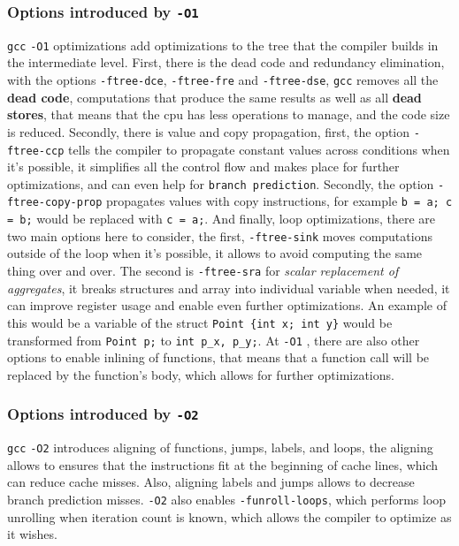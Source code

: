 \documentclass{rapport}
\newcommand{\gcc}{\texttt{gcc} }
\newcommand{\optione}{\texttt{-O1} }
\newcommand{\optitwo}{\texttt{-O2} }
\begin{document}
\subsubsection{Options introduced by \optione}
\gcc \optione optimizations add optimizations to the tree that the compiler builds in the intermediate level.
\newline
First, there is the dead code and redundancy elimination, with the options \texttt{-ftree-dce}, \texttt{-ftree-fre} and \texttt{-ftree-dse}, \gcc removes all the \textbf{dead code}, computations that produce the same results as well as all \textbf{dead stores}, that means that the cpu has less operations to manage, and the code size is reduced.
\newline
Secondly, there is value and copy propagation, first, the option \texttt{-ftree-ccp} tells the compiler to propagate constant values across conditions when it's possible, it simplifies all the control flow and makes place for further optimizations, and can even help for \texttt{branch prediction}. \newline Secondly, the option \texttt{-ftree-copy-prop} propagates values with copy instructions, for example \texttt{b = a; c = b;} would be replaced with \texttt{c = a;}.
\newline
And finally, loop optimizations, there are two main options here to consider, the first, \texttt{-ftree-sink} moves computations outside of the loop when it's possible, it allows to avoid computing the same thing over and over. \newline
The second is \texttt{-ftree-sra} for \textit{scalar replacement of aggregates}, it breaks structures and array into individual variable when needed, it can improve register usage and enable even further optimizations. An example of this would be a variable of the struct \texttt{Point \{int x; int y\}} would be transformed from \texttt{Point p;} to \texttt{int p\_x, p\_y;}.
\newline
At \optione, there are also other options to enable inlining of functions, that means that a function call will be replaced by the function's body, which allows for further optimizations.


\subsubsection{Options introduced by \optitwo}
\gcc \optitwo introduces aligning of functions, jumps, labels, and loops, the aligning allows to ensures that the instructions fit at the beginning of cache lines, which can reduce cache misses. Also, aligning labels and jumps allows to decrease branch prediction misses.
\newline
\optitwo also enables \texttt{-funroll-loops}, which performs loop unrolling when iteration count is known, which allows the compiler to optimize as it wishes.
\end{document}
